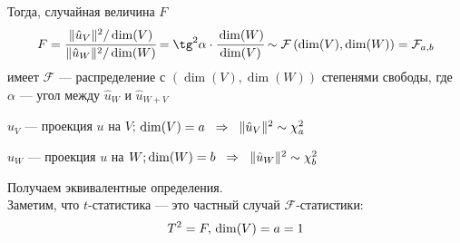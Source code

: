 \documentclass[12pt]{article} %
\theoremstyle{definition} %
\def \hu{\hat{u}}
\def \cF{\mathcal{F}}
\def \cChi{\mathcal{\chi}}
\begin{document}
\begin{geom_def}
\begin{center}
\begin{tikzpicture}[x=0.75pt,y=0.75pt,yscale=-1,xscale=1]
\end{tikzpicture}
\end{center}
Тогда, случайная величина $F$ \[
        F = \cfrac{\lVert \hu_V \rVert ^2 / \dim(V)}{\lVert \hu_W \rVert ^2 / \dim(W)} =  {\tg}^2\alpha \cdot \cfrac{\dim(W)}{\dim(V)}\sim \cF\left(\dim(V), \dim(W)\right) = \cF_{a,b}
    \]
    имеет $\cF$ — распределение с $\left(\dim(V), \dim(W)\right)$ степенями свободы, где $\alpha$ — угол между $\hu_W$  и $\hu_{W+V}$
\end{geom_def}  

\par\par\par
    $\hu_V$ — проекция $u$ на $V$; $\dim(V) =a \hspace{0.2cm} \Rightarrow \hspace{0.2cm} \lVert \hu_V \rVert ^2 \sim \cChi_a^2 \hspace{0.2cm}$\par
    $\hu_W$ — проекция $u$ на $W; \dim(W)=b \hspace{0.2cm} \Rightarrow \hspace{0.2cm} \lVert \hu_W \rVert ^2 \sim \cChi_b^2 \hspace{0.2cm}$\par
Получаем эквивалентные определения.
\[\]
Заметим, что $t$-статистика  — это частный случай $\cF$-статистики:
\[T^2 = F, \\ \dim(V) = a = 1\]
\end{document}
